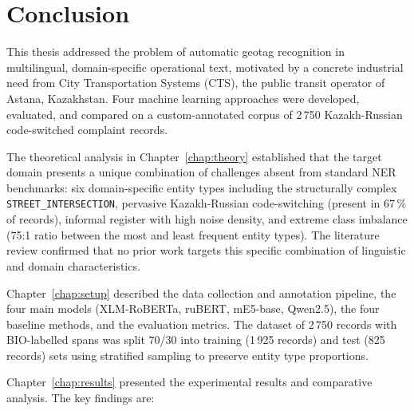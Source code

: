 %
%

\chapter{Conclusion}
\label{chap:conclusion}

This thesis addressed the problem of automatic geotag recognition in multilingual, domain-specific operational text, motivated by a concrete industrial need from City Transportation Systems (CTS), the public transit operator of Astana, Kazakhstan. Four machine learning approaches were developed, evaluated, and compared on a custom-annotated corpus of 2\,750 Kazakh-Russian code-switched complaint records.

The theoretical analysis in Chapter~\ref{chap:theory} established that the target domain presents a unique combination of challenges absent from standard NER benchmarks: six domain-specific entity types including the structurally complex \texttt{STREET\_INTERSECTION}, pervasive Kazakh-Russian code-switching (present in 67\,\% of records), informal register with high noise density, and extreme class imbalance (75:1 ratio between the most and least frequent entity types). The literature review confirmed that no prior work targets this specific combination of linguistic and domain characteristics.

Chapter~\ref{chap:setup} described the data collection and annotation pipeline, the four main models (XLM-RoBERTa, ruBERT, mE5-base, Qwen2.5), the four baseline methods, and the evaluation metrics. The dataset of 2\,750 records with BIO-labelled spans was split 70/30 into training (1\,925 records) and test (825 records) sets using stratified sampling to preserve entity type proportions.

Chapter~\ref{chap:results} presented the experimental results and comparative analysis. The key findings are:

